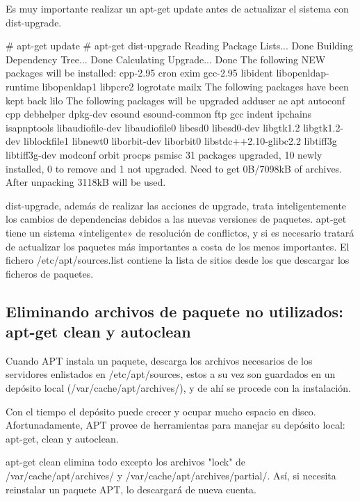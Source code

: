 \documentclass[12pt]{article}
\begin{document}
Es muy importante realizar un apt-get update antes de actualizar el sistema con dist-upgrade.

     # apt-get update
     # apt-get dist-upgrade
     Reading Package Lists... Done
     Building Dependency Tree... Done
     Calculating Upgrade... Done
     The following NEW packages will be installed:
       cpp-2.95 cron exim gcc-2.95 libident libopenldap-runtime libopenldap1
       libpcre2 logrotate mailx
     The following packages have been kept back
       lilo
     The following packages will be upgraded
       adduser ae apt autoconf cpp debhelper dpkg-dev esound esound-common ftp gcc
       indent ipchains isapnptools libaudiofile-dev libaudiofile0 libesd0
       libesd0-dev libgtk1.2 libgtk1.2-dev liblockfile1 libnewt0 liborbit-dev
       liborbit0 libstdc++2.10-glibc2.2 libtiff3g libtiff3g-dev modconf orbit
       procps psmisc
     31 packages upgraded, 10 newly installed, 0 to remove and 1 not upgraded.
     Need to get 0B/7098kB of archives. After unpacking 3118kB will be used.

           dist-upgrade, además de realizar las acciones de upgrade, trata
           inteligentemente los cambios de dependencias debidos a las nuevas
           versiones de paquetes.  apt-get tiene un sistema «inteligente» de
           resolución de conflictos, y si es necesario tratará de actualizar
           los paquetes más importantes a costa de los menos importantes. El
           fichero /etc/apt/sources.list contiene la lista de sitios desde los
           que descargar los ficheros de paquetes. 

\subsection*{Eliminando archivos de paquete no utilizados: apt-get clean y autoclean}

Cuando APT instala un paquete, descarga los archivos necesarios de los servidores enlistados en /etc/apt/sources, estos a su vez son guardados en un depósito local (/var/cache/apt/archives/), y de ahí se procede con la instalación.

Con el tiempo el depósito puede crecer y ocupar mucho espacio en disco. Afortunadamente, APT provee de herramientas para manejar su depósito local: apt-get, clean y autoclean.

apt-get clean elimina todo excepto los archivos "lock" de /var/cache/apt/archives/ y /var/cache/apt/archives/partial/. Así, si necesita reinstalar un paquete APT, lo descargará de nueva cuenta.
\end{document}

